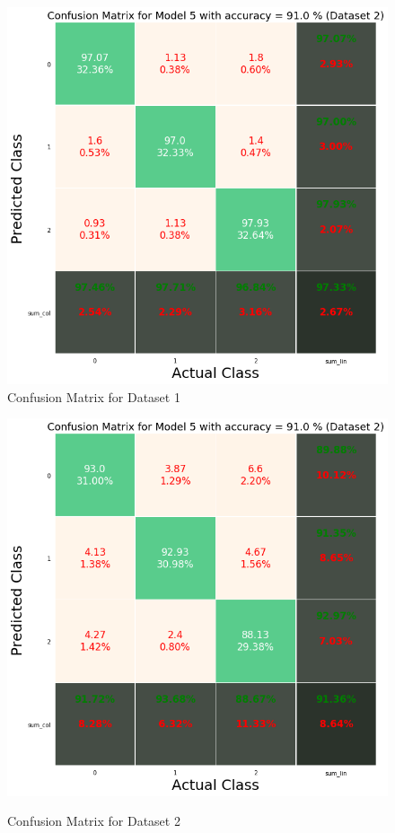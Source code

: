 \documentclass[a4 paper]{article}
\begin{document}
\begin{figure}[!htb]
    \centering
    \begin{minipage}{0.50\textwidth}
        \centering
        \includegraphics[width=1\textwidth]{cm1.png} \\
        \caption{Confusion Matrix for Dataset 1}
    \end{minipage}\hfill
    \begin{minipage}{0.50\textwidth}
        \centering
        \includegraphics[width=1\textwidth]{cm2.png}\\
        \caption{Confusion Matrix for Dataset 2}
    \end{minipage}
    \label{fig:l}
\end{figure}
\end{document}
